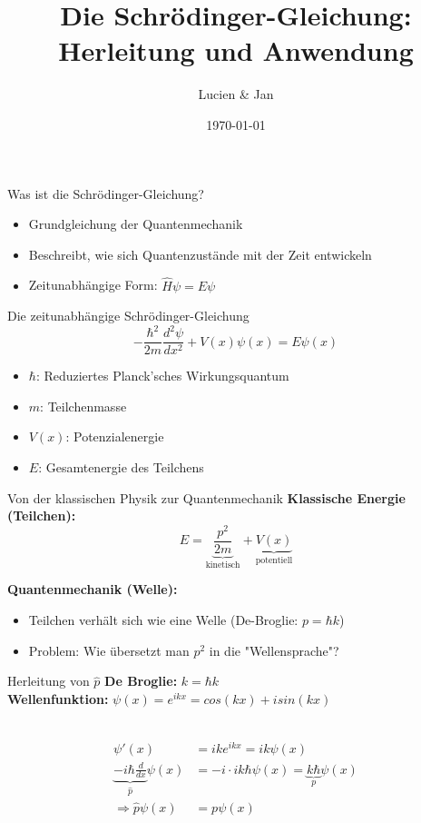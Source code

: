 \documentclass{beamer}
\title{Die Schrödinger-Gleichung: Herleitung und Anwendung}
\author{Lucien \& Jan}
\date{\today}
\begin{document}
    \begin{frame}
        \titlepage
    \end{frame}

%    

    \begin{frame}{Was ist die Schrödinger-Gleichung?}
        \begin{itemize}
            \item Grundgleichung der Quantenmechanik
            \item Beschreibt, wie sich Quantenzustände mit der Zeit entwickeln
            \item Zeitunabhängige Form: $\hat{H}\psi = E\psi$
        \end{itemize}
    \end{frame}

    \begin{frame}{Die zeitunabhängige Schrödinger-Gleichung}
        \[
            -\frac{\hbar^2}{2m}\frac{d^2\psi}{dx^2} + V(x)\psi(x) = E\psi(x)
        \]
        \begin{itemize}
            \item $\hbar$: Reduziertes Planck'sches Wirkungsquantum
            \item $m$: Teilchenmasse
            \item $V(x)$: Potenzialenergie
            \item $E$: Gesamtenergie des Teilchens
        \end{itemize}
    \end{frame}


    \begin{frame}{Von der klassischen Physik zur Quantenmechanik}
        \textbf{Klassische Energie (Teilchen):}
        \[
            E = \underbrace{\frac{p^2}{2m}}_{\text{kinetisch}} + \underbrace{V(x)}_{\text{potentiell}}
        \]

        \textbf{Quantenmechanik (Welle):}
        \begin{itemize}
            \item Teilchen verhält sich wie eine Welle (De-Broglie: $p = \hbar k$)
            \item \alert{Problem:} Wie übersetzt man $p^2$ in die "Wellensprache"?
        \end{itemize}
    \end{frame}

    \begin{frame}{Herleitung von $\hat{p}$}
        \textbf{De Broglie: } $k=\hbar k$\\
        \textbf{Wellenfunktion: } $\psi (x)=e^{ikx}=cos(kx)+i sin(kx)$\\\

        \begin{align*}
            \psi '(x)&=ike^{ikx}=ik\psi(x)\\
            \underbrace{-i\hbar\frac{d}{dx}}_{\hat{p}}\psi (x) &=-i \cdot i k\hbar\psi(x)=\underbrace{k\hbar}_{p}\psi(x)\\
            \Rightarrow \hat{p}\psi(x)&=p\psi(x)
        \end{align*}
    \end{frame}
\end{document}
